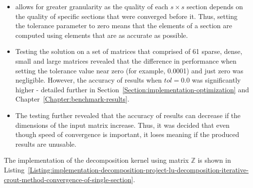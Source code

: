 \begin{itemize}
	\item \textit{} allows for greater granularity as the quality of each $ s \times s $ section depends on the quality of specific sections that were converged before it. Thus, setting the tolerance parameter to zero means that the elements of a section are computed using elements that are as accurate as possible.
	\item Testing the solution on a set of matrices that comprised of 61 sparse, dense, small and large matrices revealed that the difference in performance when setting the tolerance value near zero (for example, 0.0001) and just zero was negligible. However, the accuracy of results when $ tol = 0.0 $ was significantly higher - detailed further in Section~\ref{Section:implementation-optimization} and Chapter~\ref{Chapter:benchmark-results}.
	\item The testing further revealed that the accuracy of results can decrease if the dimensions of the input matrix increase. Thus, it was decided that even though speed of convergence is important, it loses meaning if the produced results are unusable.
\end{itemize}

The implementation of the decomposition kernel using matrix $ \mathbb{Z} $ is shown in Listing~\ref{Listing:implementation-decomposition-project-lu-decomposition-iterative-crout-method-convergence-of-single-section}.

